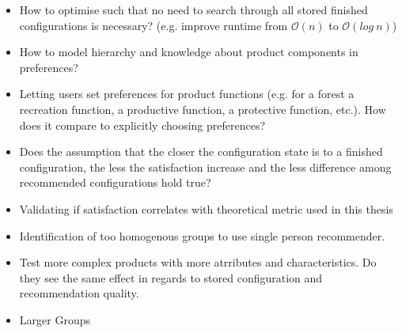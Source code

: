 \begin{itemize}
    \item How to optimise such that no need to search through all stored finished configurations is necessary? (e.g. improve runtime from $\mathcal{O}(n)$ to $\mathcal{O}(log\ n)$)
    \item How to model hierarchy and knowledge about product components in preferences?
    \item Letting users set preferences for product functions (e.g. for a forest a recreation function, a productive function, a protective function, etc.). How does it compare to explicitly choosing preferences?
    \item Does the assumption that the closer the configuration state is to a finished configuration, the less the satisfaction increase and the less difference among recommended configurations hold true?
    \item Validating if satisfaction correlates with theoretical metric used in this thesis
    \item Identification of too homogenous groups to use single person recommender.
    \item Test more complex products with more atrributes and characteristics. Do they see the same effect in regards to stored configuration and recommendation quality.
    \item Larger Groups
\end{itemize}
